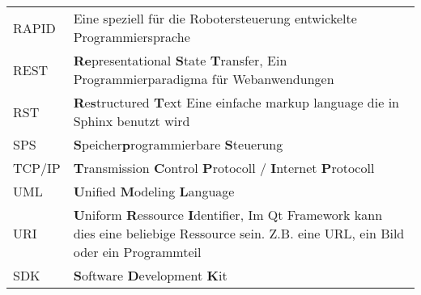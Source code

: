 \begin{center}
\begin{supertabular}{p{2.1cm}p{10.9cm}}
		RAPID     & Eine speziell für die Robotersteuerung entwickelte Programmiersprache \\
		REST      & \textbf{Re}presentational \textbf{S}tate \textbf{T}ransfer, Ein Programmierparadigma für Webanwendungen \\
		RST       & \textbf{R}e\textbf{s}tructured \textbf{T}ext Eine einfache markup language die in Sphinx benutzt wird \\
		SPS       & \textbf{S}peicher\textbf{p}rogrammierbare \textbf{S}teuerung \\
		TCP/IP    & \textbf{T}ransmission \textbf{C}ontrol \textbf{P}rotocoll / \textbf{I}nternet \textbf{P}rotocoll \\
		UML       & \textbf{U}nified \textbf{M}odeling \textbf{L}anguage \\
		URI       & \textbf{U}niform \textbf{R}essource \textbf{I}dentifier, Im Qt Framework kann dies eine beliebige Ressource sein. Z.B. eine URL, ein Bild oder ein Programmteil \\
		SDK       & \textbf{S}oftware \textbf{D}evelopment \textbf{K}it \\
	\end{supertabular}
\end{center}